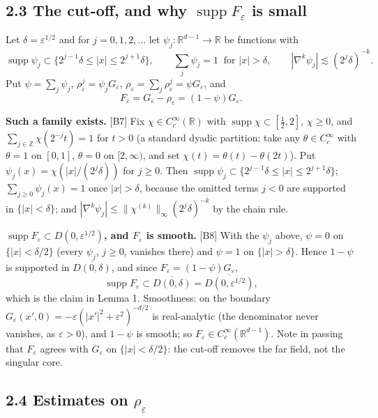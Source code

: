 \documentclass[11pt,reqno]{amsart}
\theoremstyle{plain}
\theoremstyle{definition}
\theoremstyle{plain}
\theoremstyle{definition}
\theoremstyle{remark}
\newcommand{\Rdm}{\mathbb{R}^{d-1}}
\DeclareMathOperator{\supp}{supp}
\newcommand{\Ledger}[1]{{\scriptsize\textsf{[#1]}}}
\begin{document}
\subsection*{2.3 The cut-off, and why $\supp F_\varepsilon$ is small}

Let $\delta=\varepsilon^{1/2}$ and for $j=0,1,2,\dots$ let $\psi_j:\Rdm\to\mathbb R$
be functions with
\[\supp\psi_j\subset\{2^{j-1}\delta\le|x|\le2^{j+1}\delta\},\qquad
  \sum_j\psi_j=1\ \text{ for }|x|>\delta,\qquad
  |\nabla^k\psi_j|\lesssim(2^j\delta)^{-k}.\]
Put $\psi=\sum_j\psi_j$, $\rho^j_\varepsilon=\psi_jG_\varepsilon$,
$\rho_\varepsilon=\sum_j\rho^j_\varepsilon=\psi G_\varepsilon$, and
\[F_\varepsilon=G_\varepsilon-\rho_\varepsilon=(1-\psi)G_\varepsilon .\]

\begin{filled}
\textbf{Such a family exists.} \Ledger{B7} Fix $\chi\in C^\infty_c(\mathbb R)$ with
$\supp\chi\subset[\frac12,2]$, $\chi\ge0$, and $\sum_{j\in\mathbb Z}\chi(2^{-j}t)=1$
for $t>0$ (a standard dyadic partition: take any $\theta\in C^\infty_c$ with
$\theta=1$ on $[0,1]$, $\theta=0$ on $[2,\infty)$, and set
$\chi(t)=\theta(t)-\theta(2t)$). Put $\psi_j(x)=\chi\!\left(|x|/(2^j\delta)\right)$
for $j\ge0$. Then $\supp\psi_j\subset\{2^{j-1}\delta\le|x|\le2^{j+1}\delta\}$;
$\sum_{j\ge0}\psi_j(x)=1$ once $|x|>\delta$, because the omitted terms $j<0$ are
supported in $\{|x|<\delta\}$; and $|\nabla^k\psi_j|\le\|\chi^{(k)}\|_\infty
(2^j\delta)^{-k}$ by the chain rule.
\end{filled}

\begin{expansion}
\textbf{$\supp F_\varepsilon\subset D(0,\varepsilon^{1/2})$, and $F_\varepsilon$ is
smooth.} \Ledger{B8} With the $\psi_j$ above, $\psi=0$ on $\{|x|<\delta/2\}$ (every
$\psi_j$, $j\ge0$, vanishes there) and $\psi=1$ on $\{|x|>\delta\}$. Hence
$1-\psi$ is supported in $\overline{D(0,\delta)}$, and since
$F_\varepsilon=(1-\psi)G_\varepsilon$,
\[\supp F_\varepsilon\subset\overline{D(0,\delta)}=\overline{D(0,\varepsilon^{1/2})},\]
which is the claim in Lemma 1. Smoothness: on the boundary
$G_\varepsilon(x',0)=-\varepsilon(|x'|^2+\varepsilon^2)^{-d/2}$ is real-analytic
(the denominator never vanishes, as $\varepsilon>0$), and $1-\psi$ is smooth; so
$F_\varepsilon\in C_c^\infty(\Rdm)$. Note in passing that $F_\varepsilon$ agrees
with $G_\varepsilon$ on $\{|x|<\delta/2\}$: the cut-off removes the far field, not
the singular core.
\end{expansion}

\subsection*{2.4 Estimates on $\rho_\varepsilon$}
\end{document}
